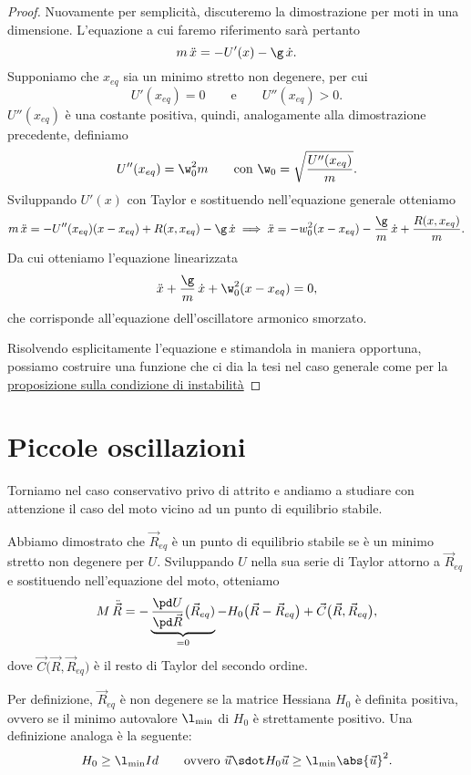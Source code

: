 \begin{proof}
	Nuovamente per semplicità, discuteremo la dimostrazione per moti in una dimensione.
	L'equazione a cui faremo riferimento sarà pertanto
	\[
		m\,\ddot{x}=-U'(x)-\g\,\dot{x}.
	\]
	Supponiamo che \(x_{eq}\) sia un minimo stretto non degenere, per cui
	\[
		U'(x_{eq}) = 0 \qquad\text{e}\qquad U''(x_{eq}) > 0.
	\]
	\(U''(x_{eq})\) è una costante positiva, quindi, analogamente alla dimostrazione precedente, definiamo
	\[
		U''(x_{eq}) = \w_0^2 m \qquad\text{con } \w_0 = \sqrt{\frac{U''(x_{eq})}{m}}.
	\]
	Sviluppando \(U'(x)\) con Taylor e sostituendo nell'equazione generale otteniamo
	\[
		m\,\ddot{x} = -U''(x_{eq})(x-x_{eq}) + R(x,x_{eq}) - \g\,\dot{x} \implies \ddot{x} = -w_0^2(x-x_{eq}) - \frac{\g}{m}\,\dot{x} + \frac{R(x,x_{eq})}{m}.
	\]
	Da cui otteniamo l'equazione linearizzata
	\[
		\ddot{x} + \frac{\g}{m}\,\dot{x} + \w_0^2 (x-x_{eq}) = 0,
	\]
	che corrisponde all'equazione dell'oscillatore armonico smorzato.
	
	Risolvendo esplicitamente l'equazione e stimandola in maniera opportuna, possiamo costruire una funzione che ci dia la tesi nel caso generale come per la \hyperref[pr:condizionaInstabilità]{proposizione sulla condizione di instabilità}
\end{proof}
%
%
\section{Piccole oscillazioni}

Torniamo nel caso conservativo privo di attrito e andiamo a studiare con attenzione il caso del moto vicino ad un punto di equilibrio stabile.

Abbiamo dimostrato che \(\vec{R}_{eq}\) è un punto di equilibrio stabile se è un minimo stretto non degenere per \(U\).
Sviluppando \(U\) nella sua serie di Taylor attorno a \(\vec{R}_{eq}\) e sostituendo nell'equazione del moto, otteniamo
\[
	M\,\ddot{\vec{R}} = -\underbrace{\frac{\pd U}{\pd \vec{R}}\big(\vec{R}_{eq})}_{= 0} - H_0 \big(\vec{R}-\vec{R}_{eq}\big) + \vec{C}\big(\vec{R},\vec{R}_{eq}\big),
\]
dove \(\vec{C}\big(\vec{R},\vec{R}_{eq}\big)\) è il resto di Taylor del secondo ordine.

\begin{oss}
	Per definizione, \(\vec{R}_{eq}\) è non degenere se la matrice Hessiana \(H_0\) è definita positiva, ovvero se il minimo autovalore \(\l_{\min}\) di \(H_0\) è strettamente positivo.
	Una definizione analoga è la seguente:
	\[
		H_0 \ge \l_{\min}Id \qquad\text{ovvero } \vec{u}\sdot H_0\vec{u} \ge \l_{\min}\abs{\vec{u}}^2.
	\]
\end{oss}

